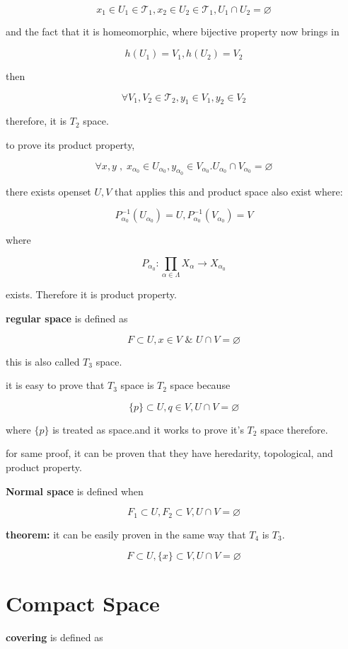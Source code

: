 \documentclass{article}
\begin{document}
\[
x_1\in U_1\in \mathcal{T}_1, x_2\in U_2\in \mathcal{T}_1, U_1 \cap U_2=\varnothing
\]

and the fact that it is homeomorphic, where bijective property now brings in

\[
h(U_1)=V_1, h(U_2)=V_2
\]

then

\[
\forall V_1, V_2\in \mathcal{T}_2, y_1\in V_1, y_2\in V_2
\]

therefore, it is $T_2$ space. 

to prove its product property, 

\[
\forall x,y \;, \; x_{\alpha_0} \in U_{\alpha_0}, y_{\alpha_0} \in V_{\alpha_0}. U_{\alpha_0}\cap V_{\alpha_0}=\varnothing
\]

there exists openset $U,V$ that applies this and product space also exist where:

\[
P^{-1}_{\alpha_0}(U_{\alpha_0})=U, P^{-1}_{\alpha_0}(V_{\alpha_0})=V
\]

where

\[
P_{\alpha_0}: \prod_{\alpha\in \Lambda} X_\alpha \rightarrow X_{\alpha_0}
\]

exists. Therefore it is product property.

\textbf{regular space} is defined as

\[
F\subset U, x\in V \text{ & } U\cap V = \varnothing
\]

this is also called $T_3$ space.

it is easy to prove that $T_3$ space is $T_2$ space because

\[
\{p\}\subset U, q\in V, U\cap V=\varnothing
\]

where $\{p\}$ is treated as space.and it works to prove it's $T_2$ space therefore.

for same proof, it can be proven that they have heredarity, topological, and product property.

\textbf{Normal space} is defined when

\[
F_1\subset U, F_2\subset V, U\cap V=\varnothing
\]

\textbf{theorem:} it can be easily proven in the same way that $T_4$ is $T_3$. 

\[
F\subset U, \{x\}\subset V, U\cap V=\varnothing
\]


\section*{Compact Space}

\textbf{covering } is defined as 
\end{document}
